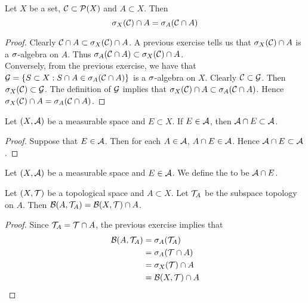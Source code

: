 \documentclass{book}
\begin{document}
	\begin{ex}  
		Let $X$ be a set, $\mathcal{C} \subset \mathcal{P}(X)$ and $A \subset X$. Then $$\sigma_X(\mathcal{C}) \cap A = \sigma_A(\mathcal{C} \cap A)$$
	\end{ex}
	
	\begin{proof}
		Clearly $\mathcal{C} \cap A \subset \sigma_X(\mathcal{C}) \cap A$. A previous exercise tells us that $\sigma_X(\mathcal{C}) \cap A$ is a $\sigma$-algebra on $A$. Thus $\sigma_A(\mathcal{C} \cap A) \subset \sigma_X(\mathcal{C}) \cap A$. \vspace{3mm} \\ 
		Conversely, from the previous exercise, we have that $\mathcal{G} = \{S \subset X: S \cap A \in \sigma_A(\mathcal{C} \cap A)\}$ is a $\sigma$-algebra on $X$. Clearly $\mathcal{C} \subset \mathcal{G}$. Then $\sigma_X(\mathcal{C}) \subset \mathcal{G}$. The definition of $\mathcal{G}$ implies that $\sigma_X(\mathcal{C}) \cap A \subset \sigma_A(\mathcal{C} \cap A)$. Hence $\sigma_X(\mathcal{C}) \cap A = \sigma_A(\mathcal{C} \cap A)$.
	\end{proof}

	\begin{ex}  
		Let $(X, \mathcal{A})$ be a measurable space and $E \subset X$. If $E \in \mathcal{A}$, then $\mathcal{A} \cap E \subset \mathcal{A}$.
	\end{ex}

	\begin{proof}
		Suppose that $E \in \mathcal{A}$. Then for each $A \in \mathcal{A}$, $A \cap E \in \mathcal{A}$. Hence $\mathcal{A} \cap E \subset \mathcal{A}$.
	\end{proof}

	\begin{defn} 
		Let $(X, \mathcal{A})$ be a measurable space and $E \in \mathcal{A}$. We define the  to be $\mathcal{A} \cap E$.
	\end{defn}

	\begin{ex} 
		Let $(X, \mathcal{T})$ be a topological space and $A \subset X$. Let $\mathcal{T}_A$ be the subspace topology on $A$. Then $\mathcal{B}(A, \mathcal{T}_A) = \mathcal{B}(X, \mathcal{T}) \cap A$.
	\end{ex}

	\begin{proof}
		Since $\mathcal{T}_A = \mathcal{T} \cap A$, the previous exercise implies that 
		\begin{align*}
			\mathcal{B}(A, \mathcal{T}_A) 
			& = \sigma_A(\mathcal{T}_A) \\
			& = \sigma_A(\mathcal{T} \cap A) \\
			& = \sigma_X(\mathcal{T}) \cap A \\
			& = \mathcal{B}(X, \mathcal{T}) \cap A
		\end{align*}
	\end{proof}
\end{document}
